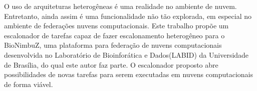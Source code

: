 
O uso de arquiteturas heterogêneas é uma realidade no ambiente de nuvem. Entretanto, ainda assim é uma funcionalidade não tão explorada, em especial no ambiente de federações nuvens computacionais. Este trabalho propõe um escalonador de tarefas capaz de fazer escalonamento heterogêneo para o BioNimbuZ, uma plataforma para federação de nuvens computacionais desenvolvida no Laboratório de Bioinforática e Dados(LABID) da Universidade de Brasília, do qual este autor faz parte. O escalonador proposto abre possibilidades de novas tarefas para serem executadas em nuvens computacionais de forma viável.

